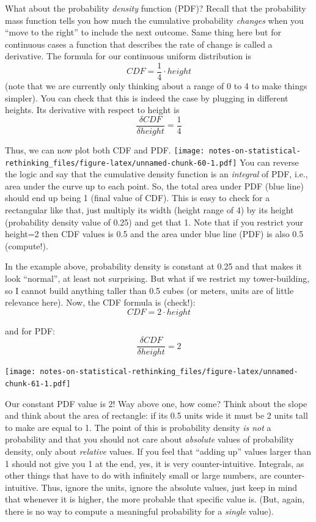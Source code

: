 \documentclass[
]{book}
\begin{document}
What about the probability \emph{density} function (PDF)? Recall that the probability mass function tells you how much the cumulative probability \emph{changes} when you ``move to the right'' to include the next outcome. Same thing here but for continuous cases a function that describes the rate of change is called a derivative. The formula for our continuous uniform distribution is
\[CDF = \frac{1}{4} \cdot height\]
(note that we are currently only thinking about a range of 0 to 4 to make things simpler). You can check that this is indeed the case by plugging in different heights. Its derivative with respect to height is
\[\frac{\delta CDF}{\delta height} = \frac{1}{4}\]

Thus, we can now plot both CDF and PDF.
\texttt{[image: notes-on-statistical-rethinking\_files/figure-latex/unnamed-chunk-60-1.pdf]}
You can reverse the logic and say that the cumulative density function is an \emph{integral} of PDF, i.e., area under the curve up to each point. So, the total area under PDF (blue line) should end up being 1 (final value of CDF). This is easy to check for a rectangular like that, just multiply its width (height range of 4) by its height (probability density value of 0.25) and get that 1. Note that if you restrict your height=2 then CDF values is 0.5 and the area under blue line (PDF) is also 0.5 (compute!).

In the example above, probability density is constant at 0.25 and that makes it look ``normal'', at least not surprising. But what if we restrict my tower-building, so I cannot build anything taller than 0.5 cubes (or meters, units are of little relevance here). Now, the CDF formula is (check!):
\[CDF = 2 \cdot height\]

and for PDF:
\[\frac{\delta CDF}{\delta height} = 2\]

\texttt{[image: notes-on-statistical-rethinking\_files/figure-latex/unnamed-chunk-61-1.pdf]}

Our constant PDF value is 2! Way above one, how come? Think about the slope and think about the area of rectangle: if its 0.5 units wide it must be 2 units tall to make are equal to 1. The point of this is probability density \emph{is not} a probability and that you should not care about \emph{absolute} values of probability density, only about \emph{relative} values. If you feel that ``adding up'' values larger than 1 should not give you 1 at the end, yes, it is very counter-intuitive. Integrals, as other things that have to do with infinitely small or large numbers, are counter-intuitive. Thus, ignore the units, ignore the absolute values, just keep in mind that whenever it is higher, the more probable that specific value is. (But, again, there is no way to compute a meaningful probability for a \emph{single} value).

  
\end{document}
